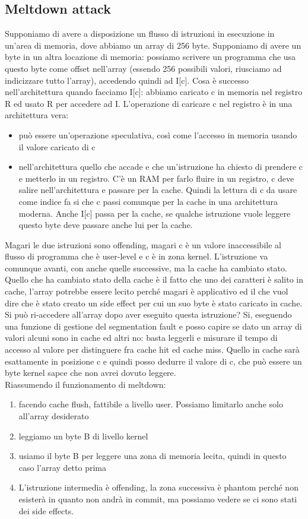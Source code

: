 \documentclass[12pt, oneside]{extbook}
\begin{document}
\subsection{Meltdown attack}
Supponiamo di avere a disposizione un flusso di istruzioni in esecuzione in un'area di memoria, dove abbiamo un array di 256 byte. Supponiamo di avere un byte in un altra locazione di memoria: possiamo scrivere un programma che usa questo byte come offset nell'array (essendo 256 possibili valori, riusciamo ad indicizzare tutto l'array), accedendo quindi ad I[c]. Cosa è successo nell'architettura quando facciamo I[c]: abbiamo caricato c in memoria nel registro R ed usato R per accedere ad I. L'operazione di caricare c nel registro è in una architettura vera:
\begin{itemize}
\item può essere un'operazione speculativa, così come l'accesso in memoria usando il valore caricato di c
\item nell'architettura quello che accade e che un'istruzione ha chiesto di prendere c e metterlo in un registro. C'è un RAM per farlo fluire in un registro, c deve salire nell'architettura e passare per la cache. Quindi la lettura di c da usare come indice fa si che c passi comunque per la cache in una architettura moderna. Anche I[c] passa per la cache, se qualche istruzione vuole leggere questo byte deve passare anche lui per la cache.
\end{itemize}
Magari le due istruzioni sono offending, magari c è un valore inaccessibile al flusso di programma che è user-level e c è in zona kernel. L'istruzione va comunque avanti, con anche quelle successive, ma la cache ha cambiato stato. Quello che ha cambiato stato della cache è il fatto che uno dei caratteri è salito in cache, l'array potrebbe essere lecito perché magari è applicativo ed il che vuol dire che è stato creato un side effect per cui un suo byte è stato caricato in cache. Si può ri-accedere all'array dopo aver eseguito questa istruzione? Si, eseguendo una funzione di gestione del segmentation fault e posso capire se dato un array di valori alcuni sono in cache ed altri no: basta leggerli e misurare il tempo di accesso al valore per distinguere fra cache hit ed cache miss. Quello in cache sarà esattamente in posizione c e quindi posso dedurre il valore di c, che può essere un byte kernel sapce che non avrei dovuto leggere.\\ Riassumendo il funzionamento di meltdown:
\begin{enumerate}
\item facendo cache flush, fattibile a livello user. Possiamo limitarlo anche solo all'array desiderato
\item leggiamo un byte B di livello kernel
\item usiamo il byte B per leggere una zona di memoria lecita, quindi in questo caso l'array detto prima
\item L'istruzione intermedia è offending, la zona successiva è phantom perché non esisterà in quanto non andrà in commit, ma possiamo vedere se ci sono stati dei side effects.
\end{enumerate} 
\end{document}
